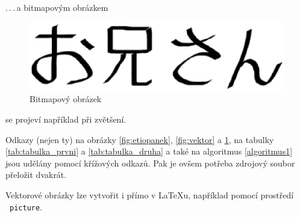 \documentclass[a4paper, 11pt]{article}
\begin{document}
\bigskip
\noindent.\,.\,.\,a bitmapovým obrázkem
\begin{figure}[h]
    \centering
    \includegraphics[scale=0.6]{oniisan2.eps}
    \caption{Bitmapový obrázek}
    \label{fig:bitmap}
\end{figure}

\bigskip
\noindent se projeví například při zvětšení.

Odkazy (nejen ty) na obrázky \ref{fig:etiopanek}, \ref{fig:vektor} a \ref{fig:bitmap}, na tabulky \ref{tab:tabulka_prvni} a \ref{tab:tabulka_druha} a také na algoritmus \ref{algoritmus1} jsou udělány pomocí křížových odkazů. Pak je ovšem potřeba zdrojový soubor přeložit dvakrát.

Vektorové obrázky lze vytvořit i přímo v \LaTeX u, například pomocí prostředí \ \texttt{picture}.

\pagebreak
\end{document}
